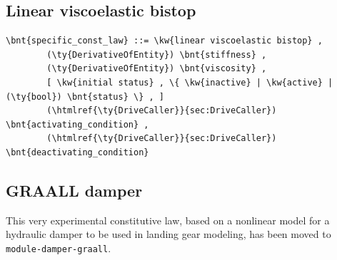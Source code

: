 \subsection{Linear viscoelastic bistop}
\begin{Verbatim}[commandchars=\\\{\}]
    \bnt{specific_const_law} ::= \kw{linear viscoelastic bistop} ,
        (\ty{DerivativeOfEntity}) \bnt{stiffness} ,
        (\ty{DerivativeOfEntity}) \bnt{viscosity} ,
        [ \kw{initial status} , \{ \kw{inactive} | \kw{active} | (\ty{bool}) \bnt{status} \} , ]
        (\htmlref{\ty{DriveCaller}}{sec:DriveCaller}) \bnt{activating_condition} ,
        (\htmlref{\ty{DriveCaller}}{sec:DriveCaller}) \bnt{deactivating_condition}
\end{Verbatim}
  
\subsection{GRAALL damper}
This very experimental constitutive law, based on a nonlinear model
for a hydraulic damper to be used in landing gear modeling,
has been moved to \texttt{module-damper-graall}.

